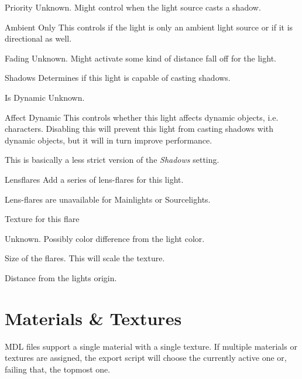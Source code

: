 \begin{property}{Priority}
Unknown. Might control when the light source casts a shadow.
\end{property}

\begin{property}{Ambient Only}
This controls if the light is only an ambient light source or
if it is directional as well.
\end{property}

\begin{property}{Fading}
Unknown. Might activate some kind of distance fall off for the light.
\end{property}

\begin{property}{Shadows}
Determines if this light is capable of casting shadows.
\end{property}

\begin{property}{Is Dynamic}
Unknown.
\end{property}

\begin{property}{Affect Dynamic}
This controls whether this light affects dynamic objects, i.e. characters.
Disabling this will prevent this light from casting shadows with dynamic
objects, but it will in turn improve performance.

This is basically a less strict version of the \textit{Shadows} setting.
\end{property}

\begin{property}{Lensflares}
Add a series of lens-flares for this light.

Lens-flares are unavailable for Mainlights or Sourcelights.
\begin{description}[leftmargin=6em,style=nextline]
    \item[Texture] Texture for this flare
    \item[Colorshift] Unknown. Possibly color difference from the light color.
    \item[Size] Size of the flares. This will scale the texture.
    \item[Position] Distance from the lights origin.
\end{description}
\end{property}

\section{Materials \& Textures}
MDL files support a single material with a single texture. If multiple 
materials or textures are assigned, the export script will choose the currently 
active one or, failing that, the topmost one.

